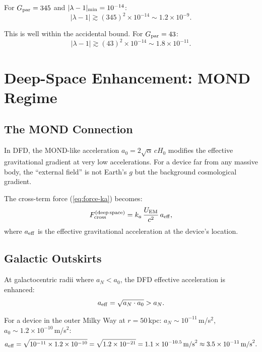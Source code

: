 \documentclass[11pt]{article}
\newcommand{\ka}{k_a}
\begin{document}
For $G_{\rm par} = 345$ and $|\lambda - 1|_{\rm min} = 10^{-14}$:
\begin{equation}
|\lambda - 1| \gtrsim (345)^2 \times 10^{-14}
  \sim 1.2 \times 10^{-9}.
\end{equation}

This is well within the accidental bound. For $G_{\rm par} = 43$:
\begin{equation}
|\lambda - 1| \gtrsim (43)^2 \times 10^{-14}
  \sim 1.8 \times 10^{-11}.
\end{equation}


\section{Deep-Space Enhancement: MOND Regime}\label{sec:MOND}

\subsection{The MOND Connection}

In DFD, the MOND-like acceleration $a_0 = 2\sqrt{\alpha}\,cH_0$ modifies
the effective gravitational gradient at very low accelerations. For a
device far from any massive body, the ``external field'' is not Earth's $g$
but the background cosmological gradient.

The cross-term force (\ref{eq:force-ka}) becomes:
\begin{equation}
F_{\rm cross}^{(\rm deep\,space)} = \ka\,\frac{U_{\rm EM}}{c^2}\,a_{\rm eff},
\end{equation}
where $a_{\rm eff}$ is the effective gravitational acceleration at the
device's location.

\subsection{Galactic Outskirts}

At galactocentric radii where $a_N < a_0$, the DFD effective acceleration
is enhanced:
\begin{equation}
a_{\rm eff} = \sqrt{a_N \cdot a_0} > a_N.
\end{equation}

For a device in the outer Milky Way at $r = 50$\,kpc:
$a_N \sim 10^{-11}$\,m/s$^2$, $a_0 \sim 1.2 \times 10^{-10}$\,m/s$^2$:
\begin{equation}
a_{\rm eff} = \sqrt{10^{-11} \times 1.2 \times 10^{-10}}
  = \sqrt{1.2 \times 10^{-21}} = 1.1 \times 10^{-10.5}\,\text{m/s}^2
  \approx 3.5 \times 10^{-11}\,\text{m/s}^2.
\end{equation}
\end{document}
